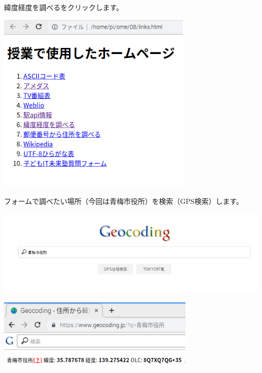 \documentclass[a4paper,12pt,dvipdfmx]{jarticle}
\begin{document}
緯度経度を調べるをクリックします。



\begin{center}
\includegraphics[width=9.398cm]{textbook-img017.png}

\end{center}

\bigskip


\bigskip

フォームで調べたい場所（今回は青梅市役所）を検索（GPS検索）します。



\begin{center}
\includegraphics[width=17.006cm]{textbook-img053.png}

\end{center}

\bigskip


\bigskip



\begin{center}
\includegraphics[width=9.525cm]{textbook-img054.png}

\end{center}
\end{document}
